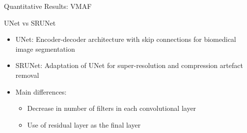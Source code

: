 \documentclass{beamer}
\begin{document}
\begin{frame}{Quantitative Results: VMAF}
\begin{table}[htb]
  \centering
  \caption{VMAF scores on a 120-second-test video.}
  \label{tab:vmaf}
\end{table}
\end{frame}

\begin{frame}{UNet vs SRUNet}
\begin{itemize}
  \item UNet: Encoder-decoder architecture with skip connections for biomedical image segmentation
  \item SRUNet: Adaptation of UNet for super-resolution and compression artefact removal
  \item Main differences:
  \begin{itemize}
    \item Decrease in number of filters in each convolutional layer
    \item Use of residual layer as the final layer
  \end{itemize}
\end{itemize}
\end{frame}
\end{document}
